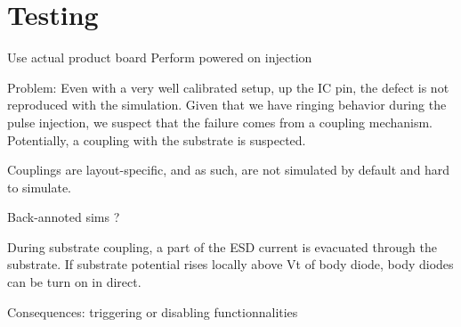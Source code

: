 \section{Testing}

Use actual product board
Perform powered on injection

Problem:
Even with a very well calibrated setup, up the IC pin, the defect is not
reproduced with the simulation.
Given that we have ringing behavior during the pulse injection, we suspect
that the failure comes from a coupling mechanism. Potentially, a coupling with
the substrate is suspected.

Couplings are layout-specific,
and as such, are not simulated by default and hard to simulate.

Back-annoted sims ?

During substrate coupling, a part of the ESD current is evacuated through the
substrate. If substrate potential rises locally above Vt of body diode, body diodes
can be turn on in direct.

Consequences: triggering or disabling functionnalities
